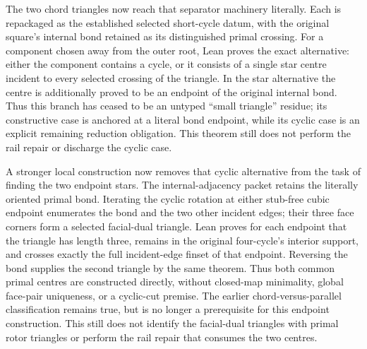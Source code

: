 \documentclass[11pt]{article}
\theoremstyle{definition}
\begin{document}
The two chord triangles now reach that separator machinery literally.  Each
is repackaged as the established selected short-cycle datum, with the original
square's internal bond retained as its distinguished primal crossing.  For a
component chosen away from the outer root, Lean proves the exact alternative:
either the component contains a cycle, or it consists of a single star centre
incident to every selected crossing of the triangle.  In the star alternative
the centre is additionally proved to be an endpoint of the original internal
bond.  Thus this branch has ceased to be an untyped ``small triangle'' residue;
its constructive case is anchored at a literal bond endpoint, while its cyclic
case is an explicit remaining reduction obligation.  This theorem still does
not perform the rail repair or discharge the cyclic case.

A stronger local construction now removes that cyclic alternative from the
task of finding the two endpoint stars.  The internal-adjacency packet retains
the literally oriented primal bond.  Iterating the cyclic rotation at either
stub-free cubic endpoint enumerates the bond and the two other incident edges;
their three face corners form a selected facial-dual triangle.  Lean proves
for each endpoint that the triangle has length three, remains in the original
four-cycle's interior support, and crosses exactly the full incident-edge
finset of that endpoint.  Reversing the bond supplies the second triangle by
the same theorem.  Thus both common primal centres are constructed directly,
without closed-map minimality, global face-pair uniqueness, or a cyclic-cut
premise.  The earlier chord-versus-parallel classification remains true, but
is no longer a prerequisite for this endpoint construction.  This still does
not identify the facial-dual triangles with primal rotor triangles or perform
the rail repair that consumes the two centres.
\end{document}
